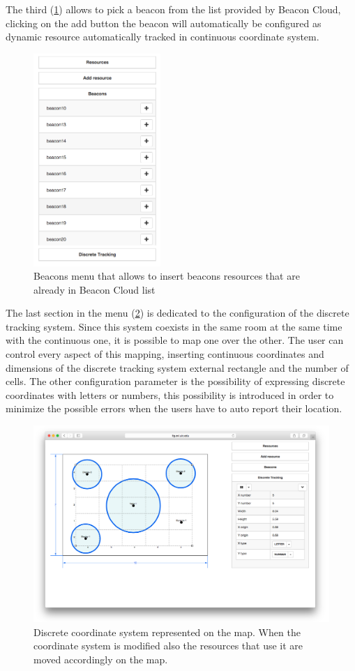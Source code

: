 The third (\ref{fig:classroom_layout_beacons}) allows to pick a beacon from the list provided by Beacon Cloud, clicking on the add button the beacon will automatically be configured as dynamic resource automatically tracked in continuous coordinate system.

\begin{figure}
\centering
\includegraphics[width=1.9in]{images/classroom-layout-beacons.png}
\caption{Beacons menu that allows to insert beacons resources that are already in Beacon Cloud list}
\label{fig:classroom_layout_beacons}
\end{figure}

The last section in the menu (\ref{fig:classroom_layout_discrete}) is dedicated to the configuration of the discrete tracking system. Since this system coexists in the same room at the same time with the continuous one, it is possible to map one over the other. The user can control every aspect of this mapping, inserting continuous coordinates and dimensions of the discrete tracking system external rectangle and the number of cells. The other configuration parameter is the possibility of expressing discrete coordinates with letters or numbers, this possibility is introduced in order to minimize the possible errors when the users have to auto report their location.

\begin{figure}
\centering
\includegraphics[width=4.5in]{images/classroom-layout-discrete.png}
\caption{Discrete coordinate system represented on the map. When the coordinate system is modified also the resources that use it are moved accordingly on the map.}
\label{fig:classroom_layout_discrete}
\end{figure}


